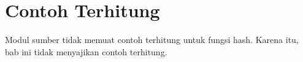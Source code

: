 \section{Contoh Terhitung}

Modul sumber tidak memuat contoh terhitung untuk fungsi hash. Karena itu, bab ini
tidak menyajikan contoh terhitung.

